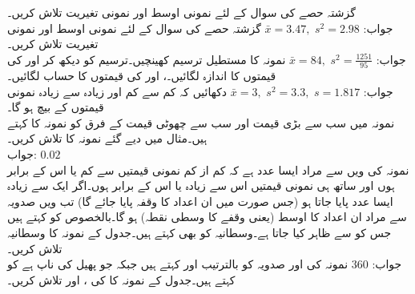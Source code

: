 \quad
گزشتہ حصے کی سوال  کے لئے نمونی اوسط اور نمونی تغیریت تلاش کریں۔\\
جواب:\quad
$\bar{x}=3.47,\,\, s^2=2.98$
\quad
گزشتہ حصے کی سوال  کے لئے نمونی اوسط اور نمونی تغیریت تلاش کریں۔\\
جواب:\quad
$\bar{x}=84,\,\,s^2=\tfrac{1251}{95}$
\quad
نمونہ  کا مستطیل ترسیم کھینچیں۔ترسیم کو دیکھ کر  اور  کی قیمتوں کا اندازہ لگائیں۔،  اور  کی قیمتوں کا حساب لگائیں۔\\
جواب:\quad
$\bar{x}=3,\,\, s^2=3.3,\,\, s=1.817$
\quad
دکھائیں کہ کم سے کم اور زیادہ سے زیادہ نمونی قیمتوں کے بیچ  ہو گا۔
\quad {}\\
نمونہ میں سب سے بڑی قیمت اور سب سے چھوٹی قیمت کے فرق کو نمونہ کا  کہتے ہیں۔مثال  میں دیے گئے نمونہ کا  تلاش کریں۔\\
جواب:\quad
$0.02$
\quad {}\\
نمونہ کی  ویں  سے مراد ایسا عدد  ہے کہ کم از کم  نمونی قیمتیں  سے کم یا اس کے برابر ہوں اور ساتھ ہی  نمونی قیمتیں اس سے زیادہ یا اس کے برابر ہوں۔اگر ایک سے زیادہ ایسا عدد پایا جاتا ہو (جس صورت میں ان اعداد کا وقفہ پایا جائے گا) تب  ویں صدویہ سے مراد ان اعداد کا اوسط (یعنی وقفے  کا وسطی نقطہ) ہو گا۔بالخصوص  کو  کہتے ہیں جس کو  سے ظاہر کیا جاتا ہے۔وسطانیہ کو  بھی کہتے ہیں۔جدول  کے نمونہ  کا وسطانیہ  تلاش کریں۔\\
جواب:\quad
$360$
\quad 
نمونہ کی  اور  صدویہ کو بالترتیب  اور  کہتے ہیں جبکہ  جو پھیل کی ناپ ہے کو  کہتے ہیں۔جدول  کے نمونہ  کا کی ،  اور  تلاش کریں۔\\
